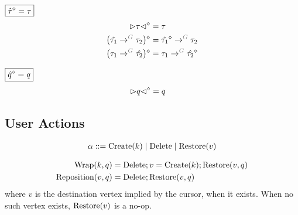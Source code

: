 \noindent $\boxed{\hat{\tau}\mathclose{}^{\diamond} = \tau}$
%
\begin{align*}
  \erase{\cursor{\tau}} &= \tau \\
  \erase{\left(\tArrow{G}{\hat{\tau_1}}{\tau_2}\right)} &= \tArrow{G}{\erase{\hat{\tau_1}}}{\tau_2} \\
  \erase{\left(\tArrow{G}{\tau_1}{\hat{\tau_2}}\right)} &= \tArrow{G}{\tau_1}{\erase{\hat{\tau_2}}}
\end{align*}

\noindent $\boxed{\hat{q}\mathclose{}^{\diamond} = q}$
%
\begin{align*}
  {\vartriangleright}q{\vartriangleleft}\mathclose{}^{\diamond} &= q
\end{align*}


\subsection{User Actions}

\[
  \arraycolsep=0pt
  \begin{array}{llll}
    \alpha & {}::={} & \Create{k} \mid \Delete \mid \Restore{v} \\
  \end{array}
\]

\begin{align*}
  \mathrm{Wrap}\mathopen{}\left(k, q\right)\mathclose{} &= \mathrm{Delete}; v=\mathrm{Create}\mathopen{}\left(k\right)\mathclose{}; \mathrm{Restore}\mathopen{}\left(v, q\right)\mathclose{} \\
  \mathrm{Reposition}\mathopen{}\left(v, q\right)\mathclose{} &= \mathrm{Delete}; \mathrm{Restore}\mathopen{}\left(v, q\right)\mathclose{} \\
\end{align*}
%
where $v$ is the destination vertex implied by the cursor, when it exists.
When no such vertex exists, $\mathrm{Restore}\mathopen{}\left(v\right)\mathclose{}$ is a no-op.